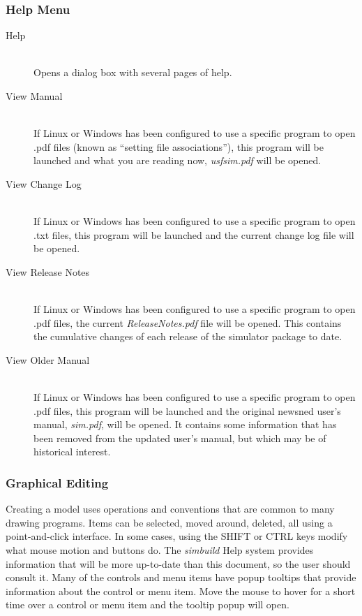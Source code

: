 \documentclass[12pt,openany,oneside]{book}
\newcommand{\prog}[1]{\textit{{#1}}}
\newcommand{\inquotes}[1]{{{``#1''}}}
\begin{document}
\subsubsection{Help Menu}
\begin{description}
   \item [Help] \hfill \\ 
      Opens a dialog box with several pages of help.
   \item [View Manual] \hfill \\ 
      If Linux or Windows has been configured to use a specific 
      program to open .pdf files (known as \inquotes{setting file 
      associations}), this program will be launched and what 
      you are reading now, \prog{usfsim.pdf} will be opened.
   \item [View Change Log] \hfill \\ 
      If Linux or Windows has been configured to use a specific 
      program to open .txt files, 
      this program will be launched and the current
      change log file will be opened.
   \item [View Release Notes] \hfill \\ 
      If Linux or Windows has been configured to use a specific 
      program to open .pdf files, the current \prog{ReleaseNotes.pdf}
      file will be opened. This contains the cumulative changes of 
      each release of the simulator package to date.
   \item [View Older Manual] \hfill \\ 
      If Linux or Windows has been configured to use a specific 
      program to open .pdf files, this program will be launched and the original 
      newsned user's manual, \prog{sim.pdf},  will be opened. It contains some information 
      that has been removed from the updated user's manual, but which may 
      be of historical interest.
\end{description}


\subsubsection{Graphical Editing}
Creating a model uses operations and conventions that are common
to many drawing programs. Items can be selected, moved around, deleted,
all using a point-and-click interface. In some cases, using the SHIFT or CTRL
keys modify what mouse motion and buttons do. The
\prog{simbuild} Help system provides information that will be more 
up-to-date than this document, so the user should consult it. Many of the
controls and menu items have popup tooltips that provide information about the
control or menu item. Move the mouse to hover for a short time over a control
or menu item and the tooltip popup will open.
\end{document}
